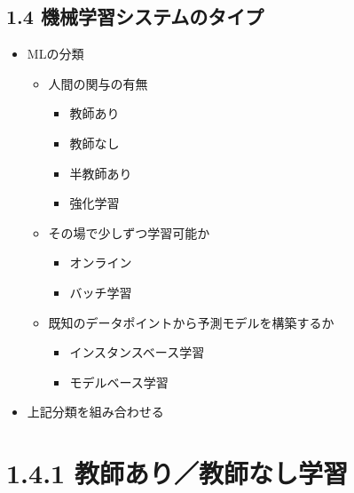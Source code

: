 \hypertarget{ux6a5fux68b0ux5b66ux7fd2ux30b7ux30b9ux30c6ux30e0ux306eux30bfux30a4ux30d7}{%
\subsection{1.4
機械学習システムのタイプ}\label{ux6a5fux68b0ux5b66ux7fd2ux30b7ux30b9ux30c6ux30e0ux306eux30bfux30a4ux30d7}}

\begin{itemize}
\tightlist
\item
  MLの分類

  \begin{itemize}
  \tightlist
  \item
    人間の関与の有無

    \begin{itemize}
    \tightlist
    \item
      教師あり
    \item
      教師なし
    \item
      半教師あり
    \item
      強化学習
    \end{itemize}
  \item
    その場で少しずつ学習可能か

    \begin{itemize}
    \tightlist
    \item
      オンライン
    \item
      バッチ学習
    \end{itemize}
  \item
    既知のデータポイントから予測モデルを構築するか

    \begin{itemize}
    \tightlist
    \item
      インスタンスベース学習
    \item
      モデルベース学習
    \end{itemize}
  \end{itemize}
\item
  上記分類を組み合わせる
\end{itemize}

\hypertarget{ux6559ux5e2bux3042ux308aux6559ux5e2bux306aux3057ux5b66ux7fd2}{%
\section{1.4.1
教師あり／教師なし学習}\label{ux6559ux5e2bux3042ux308aux6559ux5e2bux306aux3057ux5b66ux7fd2}}

